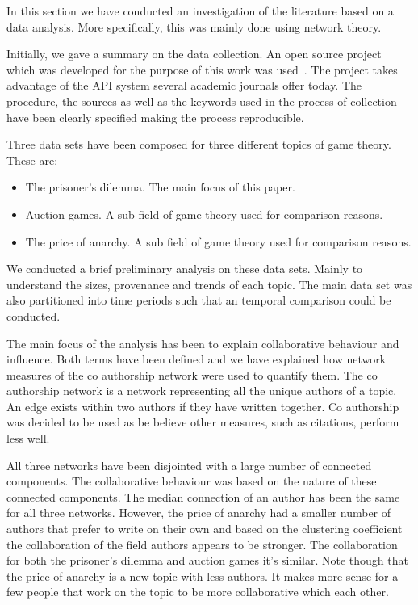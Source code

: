 \documentclass{article}
\theoremstyle{definition}
\begin{document}
In this section we have conducted an investigation of the literature based on a
data analysis. More specifically, this was mainly done using network theory.

Initially, we gave a summary on the data collection. An open source project which was
developed for the purpose of this work was used~\cite{nikoleta_2017}. The project
takes advantage of the API system several academic journals offer today. The
procedure, the sources as well as the keywords used in the process of collection
have been clearly specified making the process reproducible.

Three data sets have been composed for three different topics of game theory.
These are:

\begin{itemize}
    \item The prisoner's dilemma. The main focus of this paper.
    \item Auction games. A sub field of game theory used for comparison reasons.
    \item The price of anarchy. A sub field of game theory used for comparison reasons.
\end{itemize}

We conducted a brief preliminary analysis on these data sets. Mainly to understand
the sizes, provenance and trends of each topic. The main data set was also partitioned
into time periods such that an temporal comparison could be conducted.

The main focus of the analysis has been to explain collaborative behaviour and
influence. Both terms have been defined and we have explained how network measures
of the co authorship network were used to quantify them. The co authorship
network is a network representing all the unique authors of a topic. An edge
exists within two authors if they have written together. Co authorship was
decided to be used as be believe other measures, such as citations, perform less
well.


All three networks have been disjointed with a large number of connected components.
The collaborative behaviour was based on the nature of these connected components.
The median connection of an author has been the same for all three networks.
However, the price of anarchy had a smaller number of authors that prefer to write
on their own and based on the clustering coefficient the collaboration of the
field authors appears to be stronger. The collaboration for both the prisoner's
dilemma and auction games it's similar. Note though that the price of anarchy
is a new topic with less authors. It makes more sense for a few people that
work on the topic to be more collaborative which each other.
\end{document}
